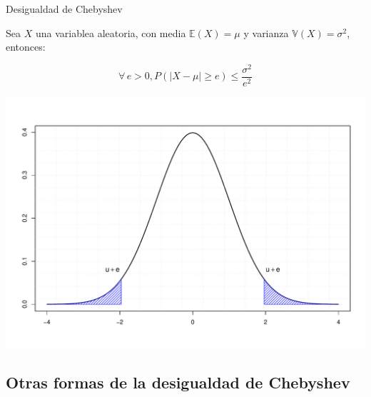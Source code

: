 \documentclass[
  ignorenonframetext,
]{beamer}
\begin{document}
\begin{frame}{Desigualdad de Chebyshev}

\justifying

Sea \(X\) una variablea aleatoria, con media \(\mathbb{E}(X)=\mu\) y
varianza \(\mathbb{V}(X)=\sigma^2\), entonces:

\[\forall \, e>0,\displaystyle  P(|X-\mu|\geq e)\leq \frac{\sigma^2}{e^2}\]

\includegraphics{clase2Inferencia_files/figure-beamer/unnamed-chunk-6-1.pdf}

\end{frame}

\hypertarget{otras-formas-de-la-desigualdad-de-chebyshev}{%
\subsection{Otras formas de la desigualdad de
Chebyshev}\label{otras-formas-de-la-desigualdad-de-chebyshev}}
\end{document}
